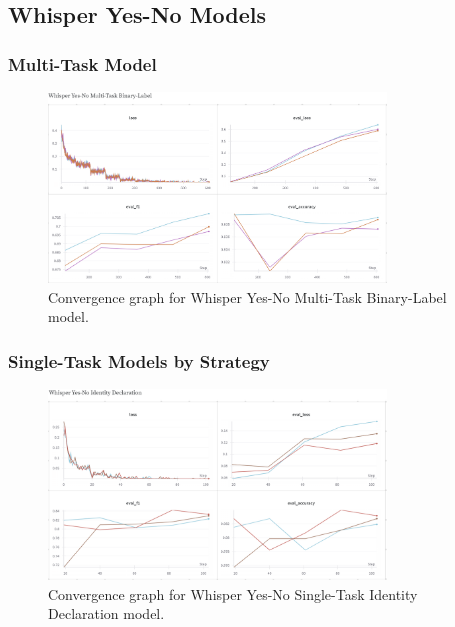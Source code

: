\documentclass{article}
\begin{document}
\subsection{Whisper Yes-No Models}

\subsubsection{Multi-Task Model}
\begin{figure}[H]
    \centering
    \includegraphics[width=0.8\textwidth]{convergence_graphs/whisper_yn_mtbl.png}
    \caption{Convergence graph for Whisper Yes-No Multi-Task Binary-Label model.}
    \label{fig:whisper_yn_mtbl}
\end{figure}

\subsubsection{Single-Task Models by Strategy}
\begin{figure}[H]
    \centering
    \includegraphics[width=0.8\textwidth]{convergence_graphs/whisper_yn_identity_declaration.png}
    \caption{Convergence graph for Whisper Yes-No Single-Task Identity Declaration model.}
    \label{fig:whisper_yn_identity_declaration}
\end{figure}
\end{document}

